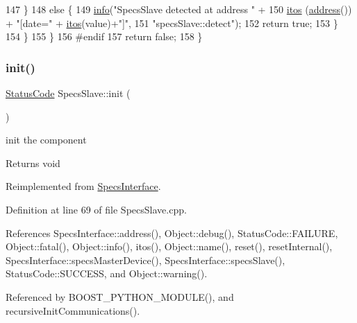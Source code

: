 \begin{DoxyCode}
147       \}
148       \textcolor{keywordflow}{else} \{
149         \hyperlink{classObject_a644fd329ea4cb85f54fa6846484b84a8}{info}(\textcolor{stringliteral}{"SpecsSlave detected at address "} + 
150              \hyperlink{Tools_8h_af330027dbdafb9a30768b3613c553e60}{itos} (\hyperlink{classSpecsInterface_a0fa039a15b842a5ba783ce825b9915d8}{address}()) + \textcolor{stringliteral}{"[date="} + \hyperlink{Tools_8h_af330027dbdafb9a30768b3613c553e60}{itos}(value)+\textcolor{stringliteral}{"]"},
151              \textcolor{stringliteral}{"specsSlave::detect"});
152         \textcolor{keywordflow}{return} \textcolor{keyword}{true};
153       \}
154     \}    
155   \}
156 \textcolor{preprocessor}{#endif
}
157   \textcolor{keywordflow}{return} \textcolor{keyword}{false};
158 \}
\end{DoxyCode}
\mbox{\label{classSpecsSlave_ab34b5117373a334027d3a5cf33287bb6}} 
\subsubsection{\texorpdfstring{init()}{init()}}
{\footnotesize\ttfamily \hyperlink{classStatusCode}{Status\+Code} Specs\+Slave\+::init (\begin{DoxyParamCaption}{ }\end{DoxyParamCaption})\hspace{0.3cm}{\ttfamily [virtual]}}

init the component

\begin{DoxyReturn}{Returns}
void 
\end{DoxyReturn}


Reimplemented from \hyperlink{classSpecsInterface_a99ec05cbe0d15892afbec6feaf33c89b}{Specs\+Interface}.



Definition at line 69 of file Specs\+Slave.\+cpp.



References Specs\+Interface\+::address(), Object\+::debug(), Status\+Code\+::\+F\+A\+I\+L\+U\+RE, Object\+::fatal(), Object\+::info(), itos(), Object\+::name(), reset(), reset\+Internal(), Specs\+Interface\+::specs\+Master\+Device(), Specs\+Interface\+::specs\+Slave(), Status\+Code\+::\+S\+U\+C\+C\+E\+SS, and Object\+::warning().



Referenced by B\+O\+O\+S\+T\+\_\+\+P\+Y\+T\+H\+O\+N\+\_\+\+M\+O\+D\+U\+L\+E(), and recursive\+Init\+Communications().



